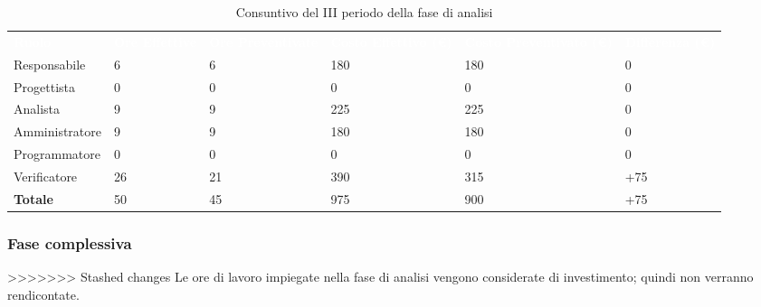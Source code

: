 \begin{table}[!htbp]
\begin{center}
\renewcommand{\arraystretch}{1.5}
\begin{tabular}{ m{}<{\centering}  m{}<{\centering} m{}<{\centering} m{}<{\centering} m{}<{\centering} m{}<{\centering}}
	\rowcolor{darkblue}
	\textcolor{white}{\textbf{Ruolo}} & \textcolor{white}{\textbf{Ore Effettive}} & \textcolor{white}{\textbf{Ore Preventivate}}&\textcolor{white}{\textbf{Costo Effettivo (\euro) }}&\textcolor{white}{\textbf{Costo Preventivato (\euro)}}&\textcolor{white}{\textbf{Differenza (\euro)}}\\ 

	Responsabile  & 6 & 6 & 180 & 180 & 0\\	
	
	Progettista & 0 & 0 & 0 & 0 & 0\\
	
	Analista & 9 & 9 & 225 & 225 & 0\\
	
	Amministratore & 9 & 9 & 180 & 180 & 0\\
	
	Programmatore & 0 & 0 &0 &0 & 0\\
	
	Verificatore & 26 & 21 & 390 & 315 & +75\\
	
	\textbf{Totale} & 50 & 45 & 975 & 900 & +75\\
	
\end{tabular}
\caption{Consuntivo del III periodo della fase di analisi}
\end{center}
\end{table}

\subsubsection{Fase complessiva}
>>>>>>> Stashed changes
Le ore di lavoro impiegate nella fase di analisi vengono considerate di investimento; quindi non verranno rendicontate.

